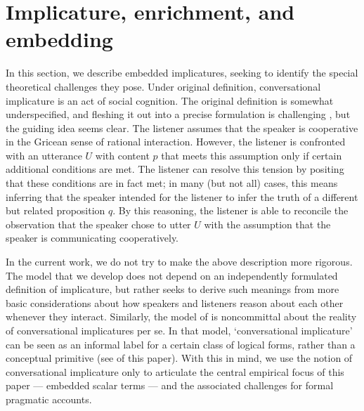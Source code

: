\documentclass[leqno,12pt]{article}
\begin{document}
\section{Implicature, enrichment, and embedding}\label{sec:implicature}


In this section, we describe embedded implicatures, seeking to
identify the special theoretical challenges they pose.  Under
 original definition, conversational implicature is
an act of social cognition. The original definition is somewhat
underspecified, and fleshing it out into a precise formulation is
challenging \citep{Hirschberg85}, but the guiding idea seems clear.
The listener assumes that the speaker is cooperative in the Gricean
sense of rational interaction. However, the listener is confronted
with an utterance $U$ with content $p$ that meets this assumption only
if certain additional conditions are met. The listener can resolve
this tension by positing that these conditions are in fact met; in
many (but not all) cases, this means inferring that the speaker
intended for the listener to infer the truth of %
a different but related proposition $q$. By
this reasoning, the listener is able to reconcile the observation that
the speaker chose to utter $U$ with the assumption that the speaker is
communicating cooperatively.

In the current work, we do not try to make the above description more
rigorous. The model that we develop does not depend on an
independently formulated definition of implicature, but rather seeks
to derive such meanings from more basic considerations about how
speakers and listeners reason about each other whenever they
interact. Similarly, the model of \citet{ChierchiaFoxSpector08} is
noncommittal about the reality of conversational implicatures per
se. In that model, `conversational implicature' can be seen as an informal
label for a certain class of logical forms, rather than a conceptual
primitive (see  of this paper). With this in mind, we
use the notion of conversational implicature only to articulate the
central empirical focus of this paper --- embedded scalar terms ---
and the associated challenges for formal pragmatic accounts.
\end{document}
